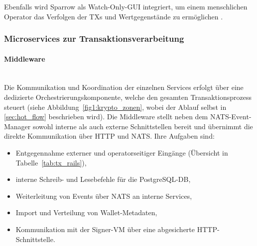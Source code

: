 Ebenfalls wird Sparrow als Watch-Only-\ac{GUI} integriert, um einem menschlichen Operator das Verfolgen der \acp{TX} und Wertgegenstände zu ermöglichen \cite{Sparrow_Wallets_Features}.


\subsubsection{Microservices zur Transaktionsverarbeitung}

\paragraph{Middleware} \mbox{}\\
Die Kommunikation und Koordination der einzelnen Services erfolgt über eine dedizierte Orchestrierungskomponente, welche den gesamten Transaktionsprozess steuert (siehe Abbildung~\ref{fig1:krypto_zonen}, wobei der Ablauf selbst in \ref{sec:hot_flow} beschrieben wird).
Die Middleware stellt neben dem \ac{NATS}-Event-Manager sowohl interne als auch externe Schnittstellen bereit und übernimmt die direkte Kommunikation über \ac{HTTP} und \ac{NATS}. Ihre Aufgaben sind:
\begin{itemize}
    \item Entgegennahme externer und operatorseitiger Eingänge (Übersicht in Tabelle~\ref{tab:tx_rails}),
    \item interne Schreib- und Lesebefehle für die PostgreSQL-\ac{DB},
    \item Weiterleitung von Events über \ac{NATS} an interne Services,
    \item Import und Verteilung von Wallet-Metadaten,
    \item Kommunikation mit der Signer-\ac{VM} über eine abgesicherte \ac{HTTP}-Schnittstelle.
\end{itemize}

